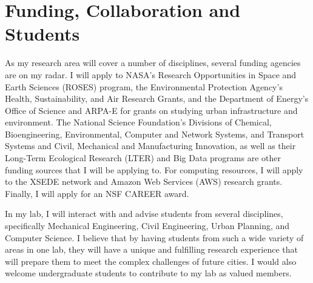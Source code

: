 \documentclass[12pt]{article}
\begin{document}
\section*{Funding, Collaboration and Students}
As my research area will cover a number of disciplines, several funding agencies are on my radar. I will apply to NASA's Research Opportunities in Space and Earth Sciences (ROSES) program, the Environmental Protection Agency's Health, Sustainability, and Air Research Grants, and the Department of Energy's Office of Science and ARPA-E for grants on studying urban infrastructure and environment. The National Science Foundation's Divisions of Chemical, Bioengineering, Environmental, Computer and Network Systems, and Transport Systems and Civil, Mechanical and Manufacturing Innovation, as well as their Long-Term Ecological Research (LTER) and Big Data programs are other funding sources that I will be applying to. For computing resources, I will apply to the XSEDE network and Amazon Web Services (AWS) research grants. Finally, I will apply for an NSF CAREER award.  

In my lab, I will interact with and advise students from several disciplines, specifically Mechanical Engineering, Civil Engineering, Urban Planning, and Computer Science. I believe that by having students from such a wide variety of areas in one lab, they will have a unique and fulfilling research experience that will prepare them to meet the complex challenges of future cities. I would also welcome undergraduate students to contribute to my lab as valued members.
\end{document}

